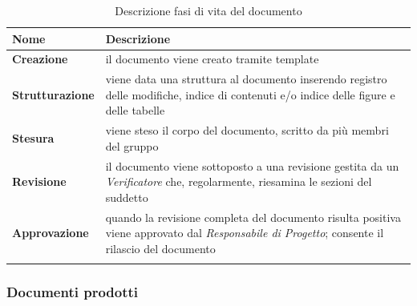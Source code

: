 {
	\setlength{\freewidth}{\dimexpr\textwidth-1\tabcolsep}
	\renewcommand{\arraystretch}{1.5}
	\setlength{\aboverulesep}{0pt}
	\setlength{\belowrulesep}{0pt}
	\begin{longtable}{L{.210\freewidth} L{.68\freewidth}}
		\textbf{Nome} & \textbf{Descrizione} \\
		\toprule
		\endhead		
		\textbf{Creazione} & il documento viene creato tramite template \\ 
		\textbf{Strutturazione} & viene data una struttura al documento inserendo registro delle modifiche, indice di contenuti e/o indice delle figure e delle tabelle\\
		\textbf{Stesura} & viene steso il corpo del documento, scritto da più membri del gruppo \\ 
		\textbf{Revisione} & il documento viene sottoposto a una revisione gestita da un \textit{Verificatore} che, regolarmente, riesamina le sezioni del suddetto \\
		\textbf{Approvazione} & quando la revisione completa del documento risulta positiva viene approvato dal \textit{Responsabile di Progetto}; consente il rilascio del documento \\ 	
				
		\bottomrule
		\hiderowcolors
		\caption{Descrizione fasi di vita del documento}
	\end{longtable}

\subsubsection{Documenti prodotti \hfil}

}
